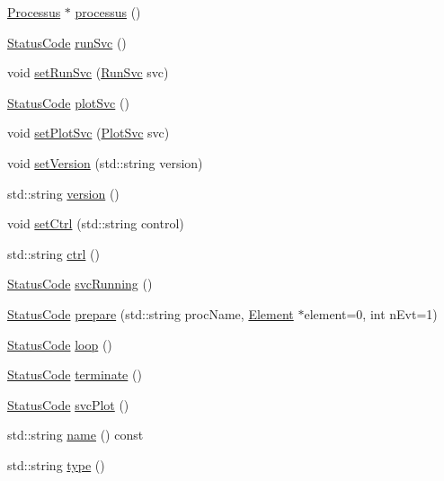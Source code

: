 \begin{DoxyCompactItemize}
\item 
\hyperlink{classProcessus}{Processus} $\ast$ \hyperlink{classApplication_a8d0918e800a5de01795bc2669d74ed82}{processus} ()
\item 
\hyperlink{classStatusCode}{StatusCode} \hyperlink{classApplication_abfbf40397efe6ff0627d2ce1a55381ce}{runSvc} ()
\item 
void \hyperlink{classApplication_a95ea0ef35377c259687752aedc4b9321}{setRunSvc} (\hyperlink{Application_8h_a02543eefd1c736af059bd210990f1dc7}{RunSvc} svc)
\item 
\hyperlink{classStatusCode}{StatusCode} \hyperlink{classApplication_a6344c22495ff3e87d77d0c47aea3bf00}{plotSvc} ()
\item 
void \hyperlink{classApplication_ac11402510105adf9a9ccf3daa25ea7d4}{setPlotSvc} (\hyperlink{Application_8h_a0d7d6b8670c377909b819ba8396d2871}{PlotSvc} svc)
\item 
void \hyperlink{classApplication_a48ecc3d76b3f2390ae1ba76d13f8bd54}{setVersion} (std::string version)
\item 
std::string \hyperlink{classApplication_a060ac7b6d3a6cb111a9ed39bfd0350d1}{version} ()
\item 
void \hyperlink{classApplication_a451a04a80f59a76fb13b6fae6c07439a}{setCtrl} (std::string control)
\item 
std::string \hyperlink{classApplication_a3eb11c9a1985a3a9d2ec51df957f7c2f}{ctrl} ()
\item 
\hyperlink{classStatusCode}{StatusCode} \hyperlink{classApplication_a35eca6b5e618b508a0736d032e2a9203}{svcRunning} ()
\item 
\hyperlink{classStatusCode}{StatusCode} \hyperlink{classApplication_a61dcc20b7f4b7c19b697db7516a62afa}{prepare} (std::string procName, \hyperlink{classElement}{Element} $\ast$element=0, int nEvt=1)
\item 
\hyperlink{classStatusCode}{StatusCode} \hyperlink{classApplication_ab38055646202ef49c9ee2eda6d48076f}{loop} ()
\item 
\hyperlink{classStatusCode}{StatusCode} \hyperlink{classApplication_a1a36a06d48d94a9a8fdc29a77d2cb9f0}{terminate} ()
\item 
\hyperlink{classStatusCode}{StatusCode} \hyperlink{classApplication_a297f55c288c32cbdadadcbbc26ae7692}{svcPlot} ()
\item 
std::string \hyperlink{classObject_a975e888d50bfcbffda2c86368332a5cd}{name} () const 
\item 
std::string \hyperlink{classObject_a84f99f70f144a83e1582d1d0f84e4e62}{type} ()

\end{DoxyCompactItemize}
